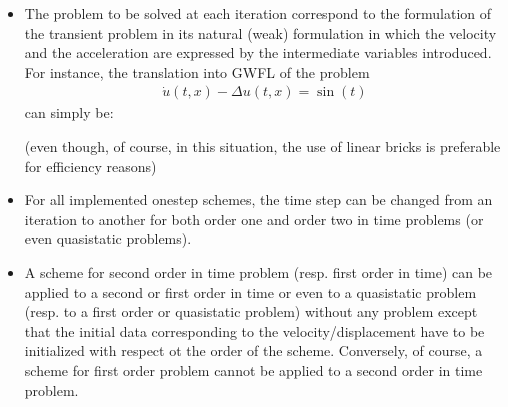 \documentclass[a4paper,11pt,english]{sphinxmanual}
\begin{document}
\begin{itemize}
\item {} 
The problem to be solved at each iteration correspond to the formulation of the transient problem in its natural (weak) formulation in which the velocity and the acceleration are expressed by the intermediate variables introduced. For instance, the translation into GWFL of the problem
\begin{equation*}
\begin{split}\dot{u}(t,x) - \Delta u(t,x) = \sin(t)\end{split}
\end{equation*}
can simply be:

\begin{sphinxVerbatim}[commandchars=\\\{\}]
    
\end{sphinxVerbatim}

(even though, of course, in this situation, the use of linear bricks is preferable for efficiency reasons)

\item {} 
For all implemented one\sphinxhyphen{}step schemes, the time step can be changed from an iteration to another for both order one and order two in time problems (or even quasi\sphinxhyphen{}static problems).

\item {} 
A scheme for second order in time problem (resp. first order in time) can be applied to a second or first order in time or even to a quasi\sphinxhyphen{}static problem (resp. to a first order or quasi\sphinxhyphen{}static problem) without any problem except that the initial data corresponding to the velocity/displacement have to be initialized with respect ot the order of the scheme. Conversely, of course, a scheme for first order problem cannot be applied to a second order in time problem.

\end{itemize}
\end{document}
